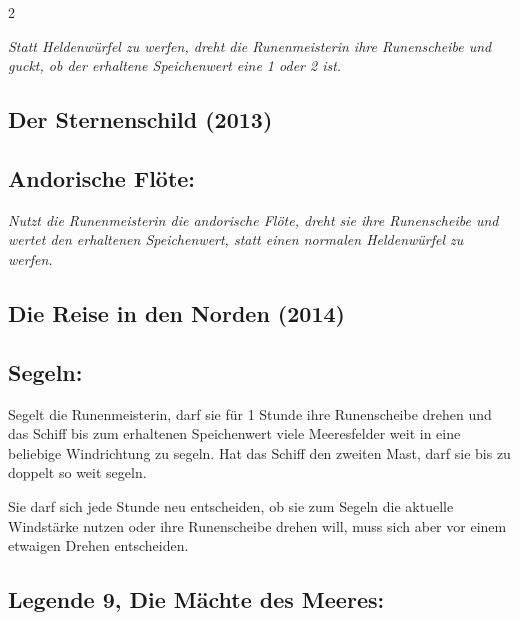 \documentclass[10pt, a4paper, oneside]{book}
\newcommand{\fan}[1]{\textit{#1}}
\begin{document}
\begin{multicols*}{2}
\begin{bgcolor}
\fan{Statt Heldenwürfel zu werfen, dreht die Runenmeisterin ihre Runenscheibe und guckt, ob der erhaltene Speichenwert eine 1 oder 2 ist.}

\end{bgcolor}






\begin{bgcolor}
\section{Der Sternenschild (2013)}

\subsection{Andorische Flöte:}

\fan{Nutzt die Runenmeisterin die andorische Flöte, dreht sie ihre Runenscheibe und wertet den erhaltenen Speichenwert, statt einen normalen Heldenwürfel zu werfen.}

\end{bgcolor}




\columnbreak



\begin{bgcolor}
\section{Die Reise in den Norden (2014)}

\subsection{Segeln:}

Segelt die Runenmeisterin, darf sie für 1 Stunde ihre Runenscheibe drehen und das Schiff bis\supercite{90045} zum erhaltenen Speichenwert viele Meeresfelder weit in eine beliebige Windrichtung zu segeln.
\supercite{MH:Runen,MH:Begleitheft}
Hat das Schiff den zweiten Mast, darf sie bis zu doppelt so weit segeln.
\supercite{90070}

Sie darf sich jede Stunde neu entscheiden, ob sie zum Segeln die aktuelle Windstärke nutzen oder ihre Runenscheibe drehen will, muss sich aber vor einem etwaigen Drehen entscheiden.
\supercite{88563}



\subsection{Legende 9, Die Mächte des Meeres:}


\end{bgcolor}
\end{multicols*}
\end{document}
